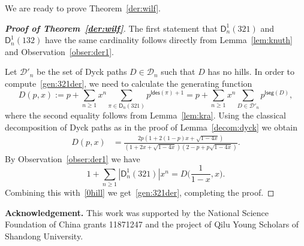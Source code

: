 \documentclass[12pt]{amsart} %
\numberwithin{equation}{section}
\theoremstyle{plain}
\theoremstyle{definition}
\newcommand\D{\mathsf{D}}
\def\hill{\mathsf{hill}}
\def\lseg{\mathsf{lseg}}
\def\ldes{\mathsf{ldes}}
\begin{document}
We are ready to prove Theorem~\ref{der:wilf}.

\begin{proof}[{\bf Proof of Theorem~\ref{der:wilf}}] The first statement  that $\D_n^1(321)$ and $\D_n^1(132)$ have the same cardinality follows directly from Lemma~\ref{lem:knuth} and Observation~\ref{obser:der1}. 



Let $\mathcal{D}'_n$ be the set of Dyck paths $D\in\mathcal{D}_n$ such that $D$ has no hills.  In order to compute~\eqref{gen:321der}, we need to calculate the generating function
$$
D(p,x):=p+\sum_{n\geq1}x^n\sum_{\pi\in\D_n(321)}p^{\ldes(\pi)+1}=p+\sum_{n\geq1}x^n\sum_{D\in\mathcal{D}'_n}p^{\lseg(D)},
$$
where the second equality follows from Lemma~\ref{lem:kra}. Using the classical decomposition of Dyck paths as in the proof of Lemma~\ref{decom:dyck} we obtain
\begin{align}\label{0hill}
D(p,x) &= \frac{2p(1+2(1-p)x+\sqrt{1-4x})}{(1+2x+\sqrt{1-4x})(2-p+p\sqrt{1-4x})}.
\end{align}
By Observation~\ref{obser:der1} we have 
$$
 1+\sum_{n\geq1}|\D_n^1(321)|x^n=D\bigl(\frac{1}{1-x},x\bigr). 
$$
Combining this with~\eqref{0hill} we get~\eqref{gen:321der}, completing the proof. 
\end{proof}
\noindent
{\bf Acknowledgement.}
This work was supported
by the National Science Foundation of China grants 11871247 and  the project of Qilu Young Scholars of Shandong University.

\bigskip
\bigskip


\end{document}
